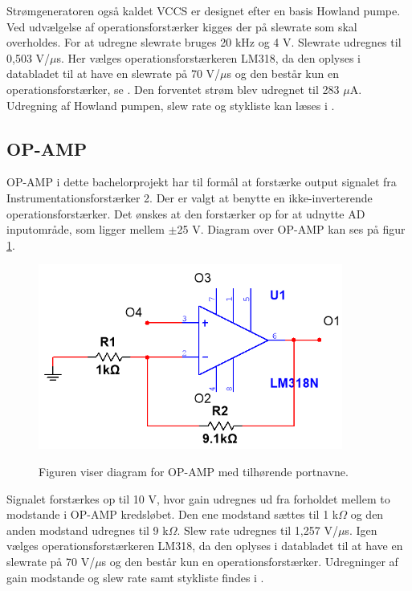 Strømgeneratoren også kaldet VCCS er designet efter en basis Howland pumpe. Ved udvælgelse af operationsforstærker kigges der på slewrate som skal overholdes. For at udregne slewrate bruges 20 kHz og 4 V. Slewrate udregnes til 0,503 V/$\mu$s. Her vælges operationsforstærkeren LM318, da den oplyses i databladet til at have en slewrate på 70 V/$\mu$s og den består kun en operationsforstærker, se . Den forventet strøm blev udregnet til 283 $\mu$A. Udregning af Howland pumpen, slew rate og stykliste kan læses i .

\pagebreak

\subsection{OP-AMP}
OP-AMP i dette bachelorprojekt har til formål at forstærke output signalet fra Instrumentationsforstærker 2. Der er valgt at benytte en ikke-inverterende operationsforstærker. Det ønskes at den forstærker op for at udnytte AD inputområde, som ligger mellem $\pm$25 V. Diagram over OP-AMP kan ses på figur \ref{fig:IkkeInviterendeOpAmp}.



\begin{figure}[H]
\centering
{\includegraphics[width=10cm]
{Figure/IkkeInviterendeOpAmp}}
\caption{Figuren viser diagram for OP-AMP med tilhørende portnavne.}
\label{fig:IkkeInviterendeOpAmp}
\end{figure}

Signalet forstærkes op til 10 V, hvor gain udregnes ud fra forholdet mellem to modstande i OP-AMP kredsløbet. Den ene modstand sættes til 1 k$\Omega$ og den anden modstand udregnes til 9 k$\Omega$. Slew rate udregnes til 1,257 V/$\mu$s. Igen vælges operationsforstærkeren LM318, da den oplyses i databladet til at have en slewrate på 70 V/$\mu$s og den består kun en operationsforstærker. Udregninger af gain modstande og slew rate samt stykliste findes i .


